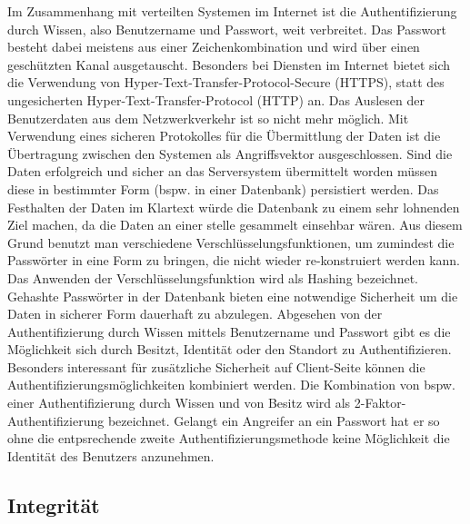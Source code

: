 \documentclass[utf8,biblatex]{lni}
\begin{document}
Im Zusammenhang mit verteilten Systemen im Internet ist die Authentifizierung durch Wissen,
also Benutzername und Passwort, weit verbreitet. 
Das Passwort besteht dabei meistens aus einer Zeichenkombination und wird über einen geschützten Kanal ausgetauscht. 
Besonders bei Diensten im Internet bietet sich die Verwendung von Hyper-Text-Transfer-Protocol-Secure (HTTPS), statt
des ungesicherten Hyper-Text-Transfer-Protocol (HTTP) an.
Das Auslesen der Benutzerdaten aus dem Netzwerkverkehr ist so nicht mehr möglich. 
Mit Verwendung eines sicheren Protokolles für die Übermittlung der Daten ist die Übertragung zwischen den Systemen 
als Angriffsvektor ausgeschlossen. 
Sind die Daten erfolgreich und sicher an das Serversystem übermittelt worden müssen diese in bestimmter Form 
(bspw. in einer Datenbank) persistiert werden. 
Das Festhalten der Daten im Klartext würde die Datenbank zu einem sehr lohnenden Ziel machen, da die Daten 
an einer stelle gesammelt einsehbar wären. 
Aus diesem Grund benutzt man verschiedene Verschlüsselungsfunktionen, um zumindest die Passwörter in eine Form zu bringen,
die nicht wieder re-konstruiert werden kann. Das Anwenden der Verschlüsselungsfunktion wird 
als Hashing bezeichnet. Gehashte Passwörter in der Datenbank bieten eine notwendige Sicherheit um die Daten in sicherer Form 
dauerhaft zu abzulegen. Abgesehen von der Authentifizierung durch Wissen mittels Benutzername und Passwort gibt es die Möglichkeit sich durch 
Besitzt, Identität oder den Standort zu Authentifizieren. 
Besonders interessant für zusätzliche Sicherheit auf Client-Seite können die 
Authentifizierungsmöglichkeiten kombiniert werden. Die Kombination von bspw. einer Authentifizierung durch Wissen und von Besitz 
wird als 2-Faktor-Authentifizierung bezeichnet. Gelangt ein Angreifer an ein Passwort hat er so ohne die entpsrechende zweite 
Authentifizierungsmethode keine Möglichkeit die Identität des Benutzers anzunehmen. \cite{Kriha.2008}

\subsection{Integrität}
\end{document}
